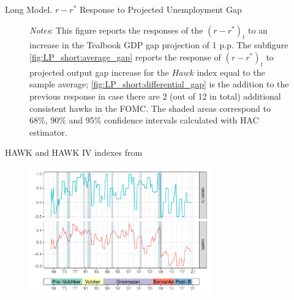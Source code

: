 \documentclass[10pt,aspectratio=169]{beamer}
\begin{document}
\begin{frame}{Long Model. $r-r^*$ Response to Projected Unemployment Gap}
\begin{figure}[!htbp]
\begin{minipage}{1\textwidth}
\begin{subfigure}[b]{0.49\textwidth}
        \end{subfigure}\vspace{-2ex}
            {\begin{flushleft}\tiny\textit{Notes}: This figure reports the responses of the $(r-r^*)_t$ to an increase in the Tealbook GDP gap projection of 1 p.p. The subfigure \ref{fig:LP_short:average_gap} reports the response of $(r-r^*)_t$ to projected output gap increase for the $\mathit{Hawk}$ index equal to the sample average; \ref{fig:LP_short:differential_gap} is the addition to the previous response in case there are 2 (out of 12 in total) additional consistent hawks in the FOMC. The shaded areas correspond to 68\%, 90\% and 95\% confidence intervals calculated with \cite{Andrews1991} HAC estimator. \end{flushleft}}
        \end{minipage}

    \end{figure}
    
\end{frame}



\begin{frame}
\end{frame}



\begin{frame}{HAWK and HAWK IV indexes from \cite{HIM2023}}
    \begin{figure}[h!]
        \includegraphics[width=0.7\textwidth]{HAWK_plot_w_heads.pdf}
    \end{figure}
\end{frame}
\end{document}
